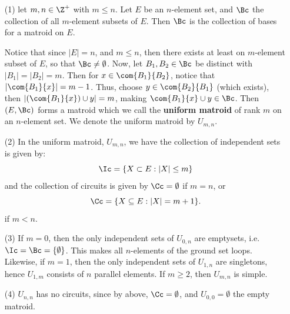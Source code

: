 \begin{example}\label{1.9}
    \begin{enumerate}
        \item[(1)] let $m,n \in \Z^+$ with  $m \leq n$. Let  $E$ be an
            $n$-element set, and  $\Bc$ the collection of all  $m$-element
            subsets of  $E$. Then  $\Bc$ is the collection of bases for a
            matroid on  $E$.

            Notice that since  $|E|=n$, and  $m \leq n$, then there exists at
            least on  $m$-element subset of $E$, so that $\Bc \neq \emptyset$.
            Now, let $B_1,B_2 \in \Bc$ be distinct with $|B_1|=|B_2|=m$. Then
            for $x \in \com{B_1}{B_2}$, notice that $|\com{B_1}{x}|=m-1$. Thus,
            choose $y \in \com{B_2}{B_1}$ (which exists), then $|(\com{B_1}{x})
            \cup y|=m$, making $\com{B_1}{x} \cup y \in \Bc$. Then $(E,\Bc)$
            forms a matroid which we call the \textbf{uniform matroid} of rank
            $m$ on an $n$-element set. We denote the uniform matroid by
            $U_{m,n}$.

        \item[(2)] In the uniform matroid, $U_{m,n}$, we have the collection of
            independent sets is given by:
            \begin{equation*}
                \Ic=\{X \subset E : |X| \leq m\}
            \end{equation*}
            and the collection of circuits is given by $\Cc=\emptyset$ if
            $m=n$, or
            \begin{equation*}
                \Cc=\{X \subseteq E : |X|=m+1\}.
            \end{equation*}
            if $m<n$.

        \item[(3)] If $m=0$, then the only independent sets of  $U_{0,n}$ are
            emptysets, i.e. $\Ic=\Bc=\{\emptyset\}$. This makes all $n$-elements
            of the ground set loops. Likewise, if  $m=1$, then the only
            independent sets of  $U_{1,n}$ are singletons, hence $U_{1,m}$
            consists of $n$ parallel elements. If  $m \geq 2$, then $U_{m,n}$ is
            simple.

        \item[(4)] $U_{n,n}$ has no circuits, since by above, $\Cc=\emptyset$,
            and $U_{0,0}=\emptyset$ the empty matroid.
    \end{enumerate}
\end{example}

